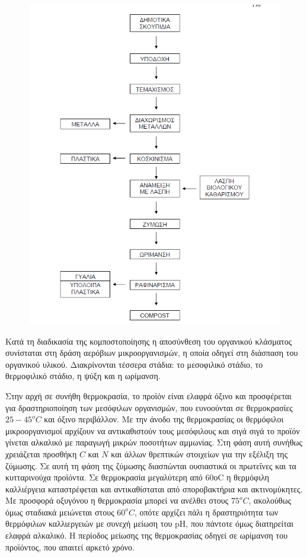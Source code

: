 \documentclass[12pt]{article}
\begin{document}
 	\begin{figure} [H]
 		\begin{center}
 			\includegraphics [scale = 0.40] {diagram4.png}
 		\end{center}
 	\end{figure}
 
 	Κατά τη διαδικασία της κομποστοποίησης η αποσύνθεση του οργανικού κλάσματος συνίσταται στη δράση αερόβιων μικροοργανισμών, η οποία οδηγεί στη διάσπαση του οργανικού υλικού. Διακρίνονται τέσσερα στάδια: το μεσοφιλικό στάδιο, το θερμοφιλικό στάδιο, η ψύξη και η ωρίμανση.  
 	
 	Στην αρχή σε συνήθη θερμοκρασία, το προϊόν είναι ελαφρά όξινο και προσφέρεται για δραστηριοποίηση των μεσόφιλων οργανισμών, που ευνοούνται σε θερμοκρασίες $25-45^o C$ και όξινο περιβάλλον. Με την άνοδο της θερμοκρασίας οι θερμόφιλοι μικροοργανισμοί αρχίζουν να αντικαθιστούν τους μεσόφιλους και σιγά σιγά το προϊόν γίνεται αλκαλικό με παραγωγή μικρών ποσοτήτων αμμωνίας. Στη φάση αυτή συνήθως χρειάζεται προσθήκη $C$ και $N$ και άλλων θρεπτικών στοιχείων για την εξέλιξη της ζύμωσης. Σε αυτή τη φάση της ζύμωσης διασπώνται ουσιαστικά οι πρωτεΐνες και τα κυτταρινούχα προϊόντα. Σε θερμοκρασία μεγαλύτερη από 60οC η θερμόφιλη καλλιέργεια καταστρέφεται και αντικαθίσταται από σποροβακτήρια και ακτινομύκητες. Με προσφορά οξυγόνου η θερμοκρασία μπορεί να ανέλθει στους $75^o C$, ακολούθως όμως σταδιακά μειώνεται στους $60^o C$, οπότε αρχίζει πάλι η δραστηριότητα των θερμόφιλων καλλιεργειών με συνεχή μείωση του pH, που πάντοτε όμως διατηρείται ελαφρά αλκαλικό. Η περίοδος μείωσης της θερμοκρασίας οδηγεί σε ωρίμανση του προϊόντος, που απαιτεί αρκετό χρόνο.
 	
\end{document}
